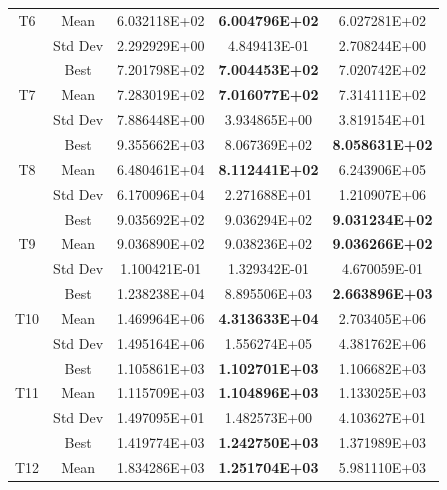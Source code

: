 \documentclass[letterpaper]{article}
\begin{document}
\begin{center}
\begin{table}[htbp]
\begin{center}
{\begin{tabular}{|c|c|c|c|c|}
				\multicolumn{ 1}{|c|}{T6} & Mean & 6.032118E+02 & \textbf{6.004796E+02} & 6.027281E+02 \\ \cline{ 2- 5}
				\multicolumn{ 1}{|c|}{} & Std Dev & 2.292929E+00 & 4.849413E-01 & 2.708244E+00 \\ \hline
				\multicolumn{ 1}{|c|}{} & Best & 7.201798E+02 & \textbf{7.004453E+02} & 7.020742E+02 \\ \cline{ 2- 5}
				\multicolumn{ 1}{|c|}{T7} & Mean & 7.283019E+02 & \textbf{7.016077E+02} & 7.314111E+02 \\ \cline{ 2- 5}
				\multicolumn{ 1}{|c|}{} & Std Dev & 7.886448E+00 & 3.934865E+00 & 3.819154E+01 \\ \hline
				\multicolumn{ 1}{|c|}{} & Best & 9.355662E+03 & 8.067369E+02 & \textbf{8.058631E+02} \\ \cline{ 2- 5}
				\multicolumn{ 1}{|c|}{T8} & Mean & 6.480461E+04 & \textbf{8.112441E+02} & 6.243906E+05 \\ \cline{ 2- 5}
				\multicolumn{ 1}{|c|}{} & Std Dev & 6.170096E+04 & 2.271688E+01 & 1.210907E+06 \\ \hline
				\multicolumn{ 1}{|c|}{} & Best & 9.035692E+02 & 9.036294E+02 & \textbf{9.031234E+02} \\ \cline{ 2- 5}
				\multicolumn{ 1}{|c|}{T9} & Mean & 9.036890E+02 & 9.038236E+02 & \textbf{9.036266E+02} \\ \cline{ 2- 5}
				\multicolumn{ 1}{|c|}{} & Std Dev & 1.100421E-01 & 1.329342E-01 & 4.670059E-01 \\ \hline
				\multicolumn{ 1}{|c|}{} & Best & 1.238238E+04 & 8.895506E+03 & \textbf{2.663896E+03} \\ \cline{ 2- 5}
				\multicolumn{ 1}{|c|}{T10} & Mean & 1.469964E+06 & \textbf{4.313633E+04} & 2.703405E+06 \\ \cline{ 2- 5}
				\multicolumn{ 1}{|c|}{} & Std Dev & 1.495164E+06 & 1.556274E+05 & 4.381762E+06 \\ \hline
				\multicolumn{ 1}{|c|}{} & Best & 1.105861E+03 & \textbf{1.102701E+03} & 1.106682E+03 \\ \cline{ 2- 5}
				\multicolumn{ 1}{|c|}{T11} & Mean & 1.115709E+03 & \textbf{1.104896E+03} & 1.133025E+03 \\ \cline{ 2- 5}
				\multicolumn{ 1}{|c|}{} & Std Dev & 1.497095E+01 & 1.482573E+00 & 4.103627E+01 \\ \hline
				\multicolumn{ 1}{|c|}{} & Best & 1.419774E+03 & \textbf{1.242750E+03} & 1.371989E+03 \\ \cline{ 2- 5}
				\multicolumn{ 1}{|c|}{T12} & Mean & 1.834286E+03 & \textbf{1.251704E+03} & 5.981110E+03 \\ \cline{ 2- 5}

\end{tabular}}
\end{center}
\end{table}
\end{center}
\end{document}
